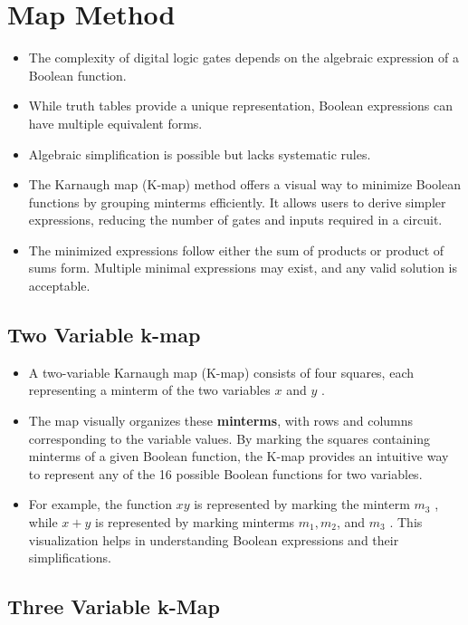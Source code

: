 \section{Map Method} 

\begin{itemize}
    \item The complexity of digital logic gates depends on the algebraic expression of a Boolean function. 
    \item While truth tables provide a unique representation, Boolean expressions can have multiple equivalent forms. 
    \item Algebraic simplification is possible but lacks systematic rules. 
    \item The \color{blue} Karnaugh map (K-map) \color{black} method offers a visual way to minimize Boolean functions by grouping minterms efficiently. It allows users to derive simpler expressions, reducing the number of gates and inputs required in a circuit. 
    \item The minimized expressions follow either the sum of products or product of sums form. Multiple minimal expressions may exist, and any valid solution is acceptable.
\end{itemize}

\subsection{Two Variable k-map}
\begin{itemize}
    \item A two-variable Karnaugh map (K-map) consists of four squares, each representing a minterm of the two variables  $x$  and  $y$ . 
    \item The map visually organizes these \textbf{minterms}, with rows and columns corresponding to the variable values. By marking the squares containing minterms of a given Boolean function, the K-map provides an intuitive way to represent any of the 16 possible Boolean functions for two variables. 
    \item For example, the function  $xy$  is represented by marking the minterm  $m_3$ , while  $x + y $ is represented by marking minterms  $m_1, m_2$,  and  $m_3$ . This visualization helps in understanding Boolean expressions and their simplifications.
\end{itemize}

\subsection{Three Variable k-Map}

